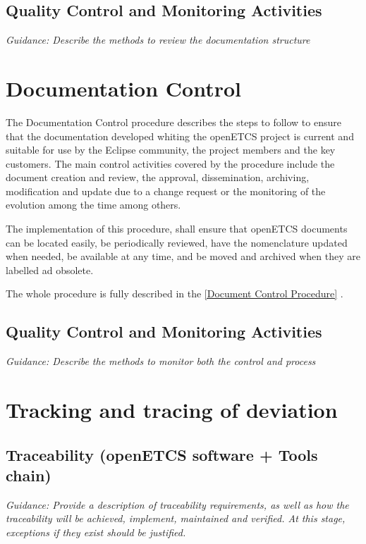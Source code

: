 \documentclass{template/openetcs_article}
\begin{document}
\subsection{Quality Control and Monitoring Activities}
\textit{Guidance: Describe the methods to review the documentation structure}



\section{Documentation Control}
The Documentation Control procedure describes the steps to follow to ensure that the documentation developed whiting the openETCS project is current and suitable for use by the Eclipse community, the project members and the key customers. The main control activities covered by the procedure include the document creation and review, the approval, dissemination, archiving, modification and update due to a change request or the monitoring of the evolution among the time among others.

The implementation of this procedure, shall ensure that openETCS documents can be located easily, be periodically reviewed, have the nomenclature updated when needed, be available at any time, and be moved and archived when they are labelled ad obsolete.

The whole procedure is fully described in the \href{https://github.com/openETCS/governance/tree/master/Document%20Control%20Process}{[Document Control Procedure]} .

\subsection{Quality Control and Monitoring Activities}
\textit{Guidance: Describe the methods to monitor both the control and process}

\section{Tracking and tracing of deviation}


\subsection{Traceability (openETCS software + Tools chain)}
\textit{Guidance: Provide a description of traceability requirements, as well as how the traceability will be achieved, implement, maintained and verified. At this stage, exceptions if they exist should be justified.}
\end{document}
